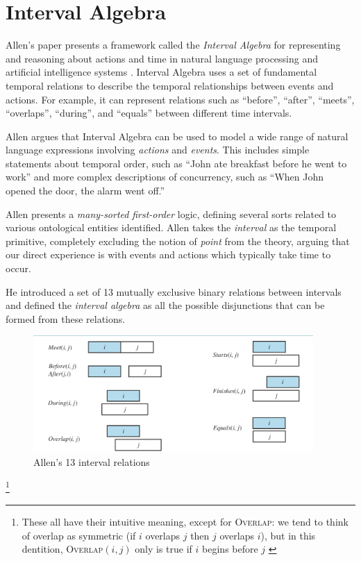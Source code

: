 \section{Interval Algebra}

Allen's paper presents a framework called the \textit{Interval Algebra} for representing and reasoning about actions and time in natural language processing and artificial intelligence systems \cite{allen1984towards}. Interval Algebra uses a set of fundamental temporal relations to describe the temporal relationships between events and actions. For example, it can represent relations such as ``before'', ``after'', ``meets'', ``overlaps'', ``during'', and ``equals'' between different time intervals.

Allen argues that Interval Algebra can be used to model a wide range of natural language expressions involving \textit{actions} and \textit{events}. This includes simple statements about temporal order, such as ``John ate breakfast before he went to work'' and more complex descriptions of concurrency, such as ``When John opened the door, the alarm went off.''

Allen presents a \textit{many-sorted} \textit{first-order} logic, defining several sorts related to various ontological entities identified.
Allen takes the \textit{interval} as the temporal primitive, completely excluding the notion of \textit{point} from the theory, arguing that our direct experience
is with events and actions which typically take time to occur.

He introduced a set of 13 mutually exclusive binary relations between intervals and
defined the \textit{interval algebra} as all the possible disjunctions that can be formed from these relations.

\begin{figure}[H]
	\begin{center}
		\includegraphics[width=0.95\textwidth]{images/allen-13-interval-logic.png}
	\end{center}
	\caption{Allen's 13 interval relations}
	\label{fig: allen-13-interval-logic}
\end{figure}\footnote{These all have their intuitive meaning, except for \textsc{Overlap}: we tend to think of
	overlap as symmetric (if $i$ overlaps $j$ then $j$ overlaps $i$), but in this dentition, \textsc{Overlap}$(i, j)$
	only is true if $i$ begins before $j$ \cite{russell2016artificial}
}


